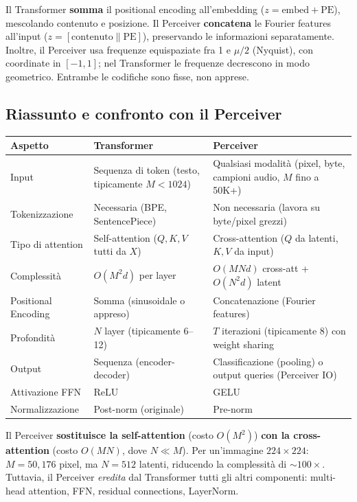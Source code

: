 \documentclass[
  11pt,
]{article}
\begin{document}
\begin{notabox}[title={\textbf{Differenza con il Perceiver}}]
Il Transformer \textbf{somma} il positional encoding all'embedding ($z = \text{embed} + \text{PE}$), mescolando contenuto e posizione. Il Perceiver \textbf{concatena} le Fourier features all'input ($z = [\text{contenuto} \| \text{PE}]$), preservando le informazioni separatamente. Inoltre, il Perceiver usa frequenze equispaziate fra 1 e $\mu/2$ (Nyquist), con coordinate in $[-1, 1]$; nel Transformer le frequenze decrescono in modo geometrico. Entrambe le codifiche sono fisse, non apprese.
\end{notabox}

\subsection{Riassunto e confronto con il Perceiver}

{\small
\begin{longtable}{@{}p{3cm}p{5cm}p{5cm}@{}}
\toprule
\textbf{Aspetto} & \textbf{Transformer} & \textbf{Perceiver} \\
\midrule\endhead
\bottomrule\endlastfoot
Input & Sequenza di token (testo, tipicamente $M < 1024$) & Qualsiasi modalità (pixel, byte, campioni audio, $M$ fino a 50K+) \\
Tokenizzazione & Necessaria (BPE, SentencePiece) & Non necessaria (lavora su byte/pixel grezzi) \\
Tipo di attention & Self-attention ($Q,K,V$ tutti da $X$) & Cross-attention ($Q$ da latenti, $K,V$ da input) \\
Complessità & $O(M^2 d)$ per layer & $O(MNd)$ cross-att + $O(N^2 d)$ latent \\
Positional Encoding & Somma (sinusoidale o appreso) & Concatenazione (Fourier features) \\
Profondità & $N$ layer (tipicamente 6--12) & $T$ iterazioni (tipicamente 8) con weight sharing \\
Output & Sequenza (encoder-decoder) & Classificazione (pooling) o output queries (Perceiver IO) \\
Attivazione FFN & ReLU & GELU \\
Normalizzazione & Post-norm (originale) & Pre-norm \\
\end{longtable}
}

\begin{notabox}[title={\textbf{Collegamento al Perceiver}}]
Il Perceiver \textbf{sostituisce la self-attention} (costo $O(M^2)$) \textbf{con la cross-attention} (costo $O(MN)$, dove $N \ll M$). Per un'immagine $224 \times 224$: $M = 50{,}176$ pixel, ma $N = 512$ latenti, riducendo la complessità di $\sim\!100\times$. Tuttavia, il Perceiver \emph{eredita} dal Transformer tutti gli altri componenti: multi-head attention, FFN, residual connections, LayerNorm.
\end{notabox}
\end{document}

